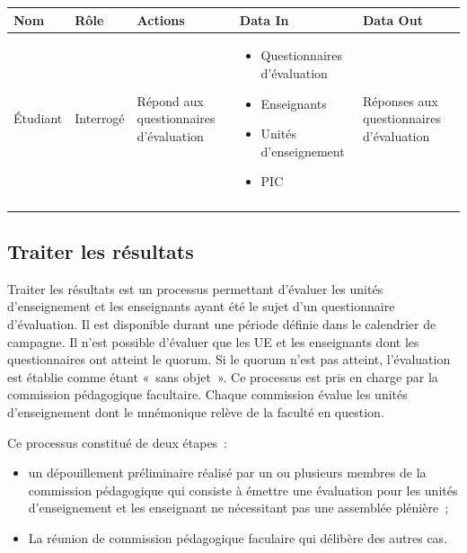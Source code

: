 \documentclass[a4paper,11pt]{report}
\begin{document}
\begin{tabularx}{\linewidth}{|l|X|X|X|X|} \hline
Nom & Rôle & Actions & Data In & Data Out \\ \hline 
Étudiant & Interrogé & Répond aux questionnaires d'évaluation & 
\begin{itemize}
	\item Questionnaires d'évaluation 
	\item Enseignants
	\item Unités d'enseignement
	\item PIC
\end{itemize}
& Réponses aux questionnaires d'évaluation \\
 & & & & \\ \hline
\end{tabularx}






\subsection{Traiter les résultats}
Traiter les résultats est un processus permettant d'évaluer les unités d'enseignement et les enseignants ayant été le sujet d'un questionnaire d'évaluation.
Il est disponible durant une période définie dans le calendrier de campagne.
Il n'est possible d'évaluer que les UE et les enseignants dont les questionnaires ont atteint le quorum.
Si le quorum n'est pas atteint, l'évaluation est établie comme étant «~sans objet~».
Ce processus est pris en charge par la commission pédagogique facultaire.
Chaque commission évalue les unités d'enseignement dont le mnémonique relève de la faculté en question.

Ce processus constitué de deux étapes~:
\begin{itemize}
	\item un dépouillement préliminaire réalisé par un ou plusieurs membres de la commission pédagogique qui consiste à émettre une évaluation pour les unités d'enseignement et les enseignant ne nécessitant pas une assemblée plénière~;
	\item La réunion de commission pédagogique faculaire qui délibère des autres cas.
\end{itemize}

\end{document}
